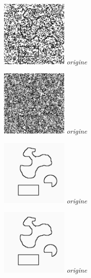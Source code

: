\documentclass[a4,12pt]{article}
\begin{document}
\begin{minipage}[c]{0.20\linewidth}
	\begin{center}
		\includegraphics[width = 33mm]{./img/p2test_grad_mean_forme2pets1.jpg}
		\textit{origine}
	\end{center}
\end{minipage}
\begin{minipage}[c]{0.20\linewidth}
	\begin{center}
		\includegraphics[width = 33mm]{./img/p2test_grad_mean_forme2pets5.jpg}
		\textit{origine}
	\end{center}
\end{minipage}
\begin{minipage}[c]{0.20\linewidth}
	\begin{center}
		\includegraphics[width = 33mm]{./img/p2test_grad_mean_forme.jpg}
		\textit{origine}
	\end{center}
\end{minipage}
\begin{minipage}[c]{0.20\linewidth}
	\begin{center}
		\includegraphics[width = 33mm]{./img/p2test_grad_mean_formes1.jpg}
		\textit{origine}
	\end{center}
\end{minipage}
\end{document}
